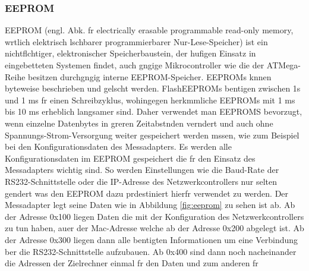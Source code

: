 \documentclass[a4paper]{book}%
\begin{document}
\subsubsection{EEPROM} 
\label{chp:eeprom}

EEPROM (engl. Abk. fr electrically erasable programmable read-only memory, wrtlich elektrisch lschbarer programmierbarer Nur-Lese-Speicher) ist ein nichtflchtiger, elektronischer Speicherbaustein, der hufigen Einsatz in eingebetteten Systemen findet, auch gngige Mikrocontroller wie die der ATMega-Reihe besitzen durchgngig interne EEPROM-Speicher.
EEPROMs knnen byteweise beschrieben und gelscht werden.
FlashEEPROMs bentigen zwischen 1s und 1 ms fr einen Schreibzyklus, wohingegen herkmmliche EEPROMs mit 1 ms bis 10 ms erheblich langsamer sind. Daher verwendet man EEPROMS bevorzugt, wenn einzelne Datenbytes in greren Zeitabstnden verndert und auch ohne Spannungs-Strom-Versorgung weiter gespeichert werden mssen, wie zum Beispiel bei den Konfigurationsdaten des Messadapters. Es werden alle 
Konfigurationsdaten im EEPROM gespeichert die fr den Einsatz des Messadapters wichtig sind. So werden Einstellungen wie die Baud-Rate der RS232-Schnittstelle oder die IP-Adresse des Netzwerkcontrollers nur selten gendert was den EEPROM dazu prdestiniert hierfr verwendet zu werden. 
Der Messadapter legt seine Daten wie in Abbildung \ref{fig:eeprom} zu sehen ist ab.
Ab der Adresse 0x100 liegen Daten die mit der Konfiguration des Netzwerkcontrollers zu tun haben, auer der Mac-Adresse welche ab der Adresse 0x200 abgelegt ist. Ab der Adresse 0x300 liegen dann alle bentigten Informationen um eine Verbindung ber die RS232-Schnittstelle aufzubauen. Ab 0x400 sind dann noch nacheinander die Adressen der Zielrechner einmal fr den Daten und zum anderen fr 
\end{document}
